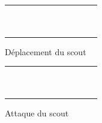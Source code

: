 \documentclass[a4paper]{scrreprt}
\begin{document}
\begin{figure}
    \centering
    \begin{tabular}{|c|c|c|c|c|c|c|c|c|c|c|}
        \hline
        &&&&&&&&&&\\ \hline
        &\cellcolor{cblue}&&&&\cellcolor{cblue}&&&&\cellcolor{cblue}  &\\ \hline
        &&\cellcolor{cblue}&&&\cellcolor{cblue}&&&\cellcolor{cblue}&&\\ \hline
        &&&\cellcolor{cblue}&&\cellcolor{cblue}&&\cellcolor{cblue}&&  &\\ \hline
        &&&&\cellcolor{cblue}&\cellcolor{cblue}&\cellcolor{cblue}&&& &\\ \hline
        &\cellcolor{cblue}&\cellcolor{cblue}&\cellcolor{cblue}&\cellcolor{cblue}&\cellcolor{yellow}&\cellcolor{cblue}&\cellcolor{cblue}&\cellcolor{cblue}&\cellcolor{cblue}  &\\ \hline
        &&&&\cellcolor{cblue}&\cellcolor{cblue}&\cellcolor{cblue}&&& &\\ \hline
        &&&\cellcolor{cblue}&&\cellcolor{cblue}&&\cellcolor{cblue}&&  &\\ \hline
        &&\cellcolor{cblue}&&&\cellcolor{cblue}&&&\cellcolor{cblue}& &\\ \hline
        &\cellcolor{cblue}&&&&\cellcolor{cblue}&&&&\cellcolor{cblue} &\\ \hline
        &&&&&&&&&&\\ \hline
    \end{tabular}
    \caption{Déplacement du scout}
    \label{fig:scoutdep}
\end{figure}

\begin{figure}
    \centering
    \begin{tabular}{|c|c|c|c|c|c|c|c|c|c|c|}
        \hline
        &&&&&&&&&&\\ \hline
        &&&&&&&&&&\\ \hline
        &&&&&&&&&&\\ \hline
        &&&&&\cellcolor{cred}&&&&&\\ \hline
        &&&&\cellcolor{cred}&\cellcolor{cred}&\cellcolor{cred}&&&&\\ \hline
        &&&\cellcolor{cred}&\cellcolor{cred}&\cellcolor{yellow}&\cellcolor{cred}&\cellcolor{cred}&&&\\ \hline
        &&&&\cellcolor{cred}&\cellcolor{cred}&\cellcolor{cred}&&&&\\ \hline
        &&&&&\cellcolor{cred}&&&&&\\ \hline
        &&&&&&&&&&\\ \hline
        &&&&&&&&&&\\ \hline
        &&&&&&&&&&\\ \hline
        
    \end{tabular}
    \caption{Attaque du scout}
    \label{fig:scoutatt}
\end{figure}
\end{document}

